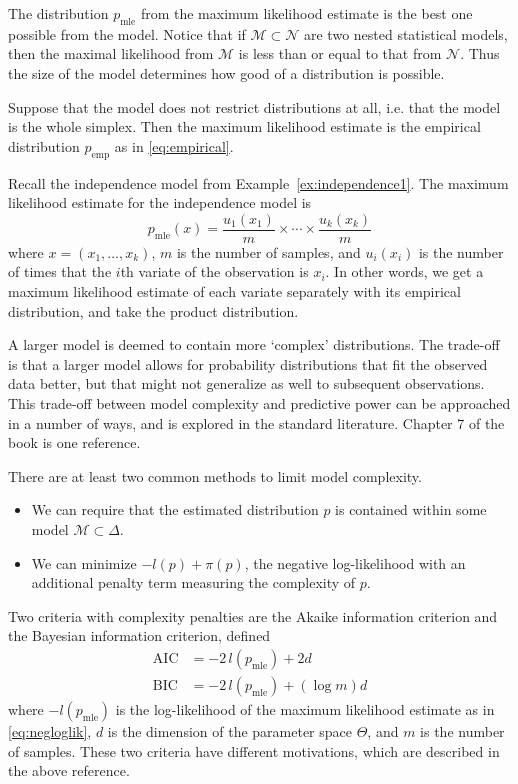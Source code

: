 \documentclass[cclicense]{hmcthesis}
\providecommand*{\ms}{\mathcal M}
\providecommand*{\ns}{\mathcal N}
\newcommand*{\mle}{\mathrm{mle}}
\newcommand*{\emp}{\mathrm{emp}}
\numberwithin{equation}{chapter}
\numberwithin{thmcounter}{chapter}
\begin{document}
    The distribution $p_\mle$ from the maximum likelihood estimate is the best
    one possible from the model.  Notice that if $\ms \subset \ns$ are two
    nested statistical models, then the maximal likelihood from $\ms$ is less
    than or equal to that from $\ns$.  Thus the size of the model determines how
    good of a distribution is possible.

    \begin{example}
        Suppose that the model does not restrict distributions at all, i.e.
        that the model is the whole simplex.  Then the maximum likelihood
        estimate is the empirical distribution $p_\emp$ as in
        \eqref{eq:empirical}.
    \end{example}

    \begin{example}
        Recall the independence model from Example~\ref{ex:independence1}.  The
        maximum likelihood estimate for the independence model is
        \[
            p_\mle(x) = \frac{u_1(x_1)}{m} \times \cdots \times \frac{u_k(x_k)}{m}
        \]
        where $x = (x_1, \ldots, x_k)$, $m$ is the number of samples, and
        $u_i(x_i)$ is the number of times that the $i$th variate of the
        observation is $x_i$.  In other words, we get a maximum likelihood
        estimate of each variate separately with its empirical distribution, and
        take the product distribution.
    \end{example}

    A larger model is deemed to contain more `complex' distributions.  The
    trade-off is that a larger model allows for probability distributions that
    fit the observed data better, but that might not generalize as well to
    subsequent observations.  This trade-off between model complexity and
    predictive power can be approached in a number of ways, and is explored in
    the standard literature.  Chapter 7 of the book \citet{EOSL} is one
    reference.  
    
    There are at least two common methods to limit model complexity.
    \begin{itemize}
    \item We can require that the estimated distribution $p$ is contained within
    some model $\ms \subset \Delta$.
    \item We can minimize $-l(p) + \pi(p)$, the negative log-likelihood with an
    additional penalty term measuring the complexity of $p$.
    \end{itemize}
    Two criteria with complexity penalties are the Akaike information criterion
    and the Bayesian information criterion, defined
    \begin{align*}
        \mathrm{AIC} &= -2\,l(p_\mle) + 2d \\
        \mathrm{BIC} &= -2\,l(p_\mle) + (\log m) d
    \end{align*}
    where $-l(p_\mle)$ is the log-likelihood of the maximum likelihood estimate
    as in \eqref{eq:negloglik}, $d$ is the dimension of the parameter space
    $\Theta$, and $m$ is the number of samples.  These two criteria have
    different motivations, which are described in the above reference.
\end{document}
